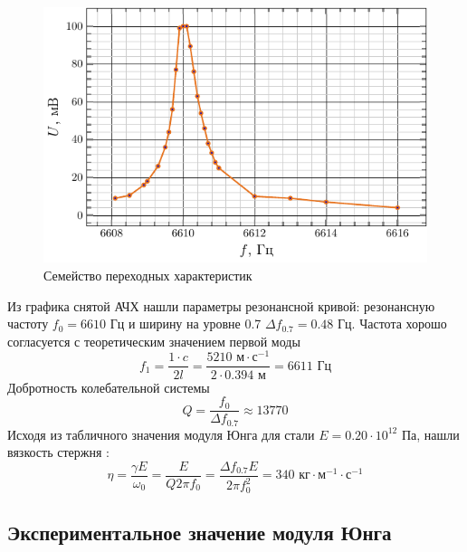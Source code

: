 \documentclass[a4paper,14pt]{extarticle}
\begin{document}
\begin{figure}[H]
	\centering
	\includegraphics[scale=1.5]{fig/steel_afc.pdf}
	\vspace{-1em}
	\caption{Семейство переходных характеристик}
	\label{fig:2}
\end{figure}
Из графика снятой АЧХ нашли параметры резонансной кривой: резонансную частоту
$f_0=6610\text{ Гц}$ и ширину на уровне 0.7 $\Delta f_{0.7} = 0.48\text{ Гц}$. 
Частота хорошо согласуется с теоретическим значением первой моды
\begin{equation}
	f_1 = \frac{1\cdot c}{2l} = \frac{5210 \text{ м}\cdot\text{с}^{-1}}{2\cdot 0.394\text{ м}}=6611 \text{ Гц}
\end{equation}
Добротность колебательной системы
\begin{equation}
	Q = \frac{f_0}{\Delta f_{0.7}} \approx 13770
\end{equation}
Исходя из табличного значения модуля Юнга для стали $E=0.20\cdot10^{12}$ Па, нашли вязкость стержня  \cite[стр. 10]{met}:
\begin{equation}
	\eta = \frac{\gamma E}{\omega_0} = \frac{ E}{Q 2\pi f_0} = \frac{\Delta f_{0.7} E}{2\pi f_0^2} = 340 \text{ кг}\cdot\text{м}^{-1}\cdot\text{с}^{-1}
\end{equation}

\newpage
\subsection{Экспериментальное значение модуля Юнга}
\end{document}
